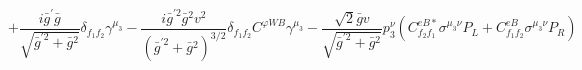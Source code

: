 %
\begin{dmath*}
%
  +  \frac{i {\bar g}^\prime {\bar g}{}}{\sqrt{{\bar g}^{\prime 2} + {\bar g}{}^2}}\delta_{f_1 f_2} \gamma^{\mu_3}  -  \frac{i {\bar g}^{\prime 2} {\bar g}{}^2 v^2}{\left({\bar g}^{\prime 2} + {\bar g}{}^2\right)^{3/2}}\delta_{f_1 f_2} C^{ \varphi  WB} \gamma^{\mu_3}  -  \frac{\sqrt{2} {\bar g}{} v}{\sqrt{{\bar g}^{\prime 2} + {\bar g}{}^2}}p_3^{\nu} \left(C^{eB*}_{f_2 f_1} \sigma^{\mu_3 \nu } P_L  + C^{eB}_{f_1 f_2} \sigma^{\mu_3 \nu } P_R \right)
%
\end{dmath*}
%
